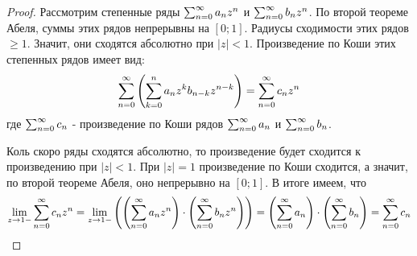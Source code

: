 \begin{proof}
	Рассмотрим степенные ряды $\sum_{n = 0}^\infty a_n z^n$ и $\sum_{n = 0}^\infty b_n z^n$. По второй теореме Абеля, суммы этих рядов непрерывны на $[0; 1]$. Радиусы сходимости этих рядов $\ge 1$. Значит, они сходятся абсолютно при $|z| < 1$. Произведение по Коши этих степенных рядов имеет вид:
	\[
		\sum_{n = 0}^\infty \left(\sum\limits_{k = 0}^n a_n z^k b_{n - k} z^{n - k}\right) = \sum\limits_{n = 0}^\infty c_n z^n
	\]
	где $\sum_{n = 0}^\infty c_n$ - произведение по Коши рядов $\sum_{n = 0}^\infty a_n$ и $\sum_{n = 0}^\infty b_n$.
	
	Коль скоро ряды сходятся абсолютно, то произведение будет сходится к произведению при $|z| < 1$. При $|z| = 1$ произведение по Коши сходится, а значит, по второй теореме Абеля, оно непрерывно на $[0; 1]$. В итоге имеем, что
	\[
		\lim\limits_{z \to 1-} \sum_{n = 0}^\infty c_n z^n = \lim\limits_{z \to 1-} \left(\left(\sum_{n = 0}^\infty a_n z^n\right) \cdot \left(\sum_{n = 0}^\infty b_n z^n\right)\right) = \left(\sum_{n = 0}^\infty a_n\right) \cdot \left(\sum_{n = 0}^\infty b_n\right) = \sum_{n = 0}^\infty c_n
	\]
\end{proof}